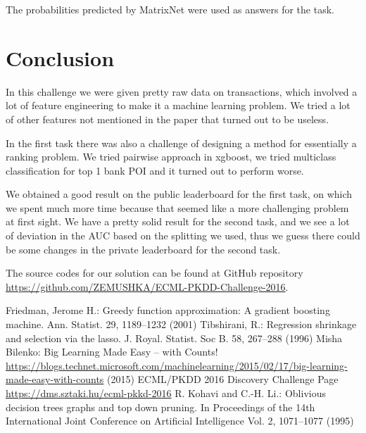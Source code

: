 \documentclass{llncs}
\begin{document}
    The probabilities predicted by MatrixNet were used as answers for the task.
    
	\section{Conclusion}
	
	In this challenge we were given pretty raw data on transactions, which involved a lot of feature engineering to make it a machine learning problem. We tried a lot of other features not mentioned in the paper that turned out to be useless.
	
	In the first task there was also a challenge of designing a method for essentially a ranking problem. We tried pairwise approach in xgboost, we tried multiclass classification for top 1 bank POI and it turned out to perform worse.
	
	We obtained a good result on the public leaderboard for the first task, on which we spent much more time because that seemed like a more challenging problem at first sight. We have a pretty solid result for the second task, and we see a lot of deviation in the AUC based on the splitting we used, thus we guess there could be some changes in the private leaderboard for the second task.
	
	The source codes for our solution can be found at GitHub repository \newline \url{https://github.com/ZEMUSHKA/ECML-PKDD-Challenge-2016}.
	
	\begin{thebibliography}{1}		
	Friedman, Jerome H.:
	Greedy function approximation: A gradient boosting machine.
	Ann. Statist. 29, 1189--1232 (2001)
	Tibshirani, R.:
	Regression shrinkage and selection via the lasso.
	J. Royal. Statist. Soc B. 58, 267--288 (1996)
	Misha Bilenko:
	Big Learning Made Easy – with Counts!
	\url{https://blogs.technet.microsoft.com/machinelearning/2015/02/17/big-learning-made-easy-with-counts} (2015)
	ECML/PKDD 2016 Discovery Challenge Page
	\url{https://dms.sztaki.hu/ecml-pkkd-2016}
	R. Kohavi and C.-H. Li.:
	Oblivious decision trees graphs and top down pruning. 
	In Proceedings of the 14th International Joint Conference on Artificial Intelligence Vol. 2, 1071--1077 (1995)
	\end{thebibliography}
	
\end{document}
